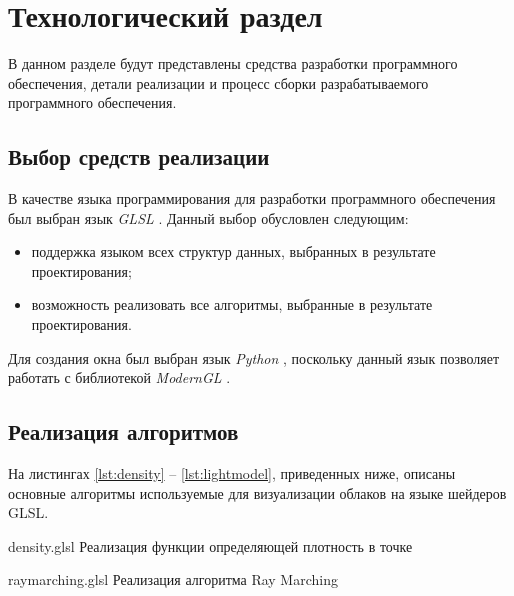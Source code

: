 \chapter{Технологический раздел}

В данном разделе будут представлены средства разработки программного обеспечения, детали реализации и процесс сборки разрабатываемого
программного обеспечения.

\section{Выбор средств реализации}

В качестве языка программирования для разработки программного обеспечения был выбран язык \textit{GLSL} \cite{glsl}. Данный выбор обусловлен следующим:
\begin{itemize}
	\item поддержка языком всех структур данных, выбранных в результате проектирования;
	\item возможность реализовать все алгоритмы, выбранные в результате проектирования.
\end{itemize}


Для создания окна был выбран язык \textit{Python} \cite{python}, поскольку данный язык позволяет работать с библиотекой \textit{ModernGL} \cite{moderngl}.


\section{Реализация алгоритмов}

На листингах \ref{lst:density} -- \ref{lst:lightmodel}, приведенных ниже, описаны основные алгоритмы используемые для визуализации облаков на языке шейдеров GLSL.



\clearpage

{density.glsl} %
{} %
{Реализация функции определяющей плотность в точке} %


\clearpage

{raymarching.glsl} %
{} %
{Реализация алгоритма Ray Marching} %


\clearpage


